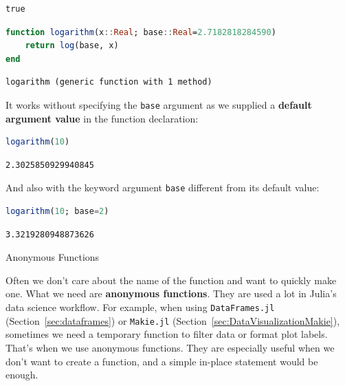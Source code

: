 \documentclass[
  notoc %
]{tufte-book}
\makeatletter
\newcommand{\passthrough}[1]{#1}
\renewcommand\subsubsection{%
\@startsection{subsubsection}{3}{\z@ }{-3.25ex\@plus -1ex \@minus -.2ex}{1.5ex \@plus .2ex}{\normalfont \normalsize \bfseries }
}
\makeatother
\begin{document}
\begin{lstlisting}[language=Output]
true
\end{lstlisting}

\begin{lstlisting}[language=Julia]
function logarithm(x::Real; base::Real=2.7182818284590)
    return log(base, x)
end
\end{lstlisting}

\begin{lstlisting}[language=Output]
logarithm (generic function with 1 method)
\end{lstlisting}

It works without specifying the \passthrough{\lstinline!base!} argument
as we supplied a \textbf{default argument value} in the function
declaration:

\begin{lstlisting}[language=Julia]
logarithm(10)
\end{lstlisting}

\begin{lstlisting}[language=Output]
2.3025850929940845
\end{lstlisting}

And also with the keyword argument \passthrough{\lstinline!base!}
different from its default value:

\begin{lstlisting}[language=Julia]
logarithm(10; base=2)
\end{lstlisting}

\begin{lstlisting}[language=Output]
3.3219280948873626
\end{lstlisting}

\hypertarget{sec:function_anonymous}{%
\subsubsection{Anonymous Functions}\label{sec:function_anonymous}}

Often we don't care about the name of the function and want to quickly
make one. What we need are \textbf{anonymous functions}. They are used a
lot in Julia's data science workflow. For example, when using
\passthrough{\lstinline!DataFrames.jl!} (Section~\ref{sec:dataframes})
or \passthrough{\lstinline!Makie.jl!}
(Section~\ref{sec:DataVisualizationMakie}), sometimes we need a
temporary function to filter data or format plot labels. That's when we
use anonymous functions. They are especially useful when we don't want
to create a function, and a simple in-place statement would be enough.
\end{document}
